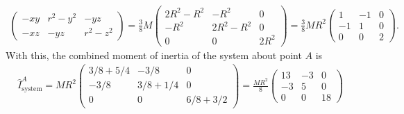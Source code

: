 \documentclass{article}
\theoremstyle{definition}
\newcommand{\f}[2]{\frac{#1}{#2}}
\begin{document}
\begin{enumerate}[label=(\alph*)]
\begin{align*}
\begin{pmatrix}
	-xy & r^2 - y^2& -yz\\
	-xz &  -yz & r^2 - z^2
	\end{pmatrix} = \f{3}{8}M\begin{pmatrix}
	2R^2-R^2 & -R^2 & 0\\
	-R^2 & 2R^2 - R^2& 0\\
	0 &  0 & 2R^2
	\end{pmatrix} = \f{3}{8}MR^2\begin{pmatrix}
	1 & -1 & 0\\
	-1 & 1& 0\\
	0 &  0 & 2
	\end{pmatrix}.
	\end{align*}
	With this, the combined moment of inertia of the system about point $A$ is 
	\begin{align*}
	\hat{I}^A_\text{system} = MR^2
	\begin{pmatrix}
	3/8+5/4& -3/8& 0 \\
	-3/8 & 3/8+1/4& 0 \\
	0 & 0 &  6/8+ 3/2
	\end{pmatrix} = 
	\boxed{\f{MR^2}{8}
	\begin{pmatrix}
	13& -3& 0 \\
	-3 & 5& 0 \\
	0 & 0 &  18
	\end{pmatrix}}
	\end{align*}
	

\end{enumerate}
\end{document}

